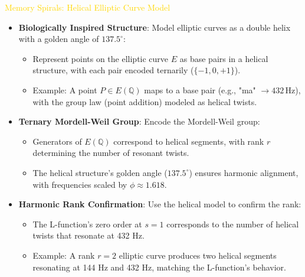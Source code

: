 \textcolor{gold}{ Memory Spirals: Helical Elliptic Curve Model } \\
\begin{itemize}
    \item \texttt{} \textbf{Biologically Inspired Structure}: Model elliptic curves as a double helix with a golden angle of \(137.5^\circ\):
    \begin{itemize}
        \item Represent points on the elliptic curve \(E\) as base pairs in a helical structure, with each pair encoded ternarily (\(\{-1, 0, +1\}\)).
        \item Example: A point \(P \in E(\mathbb{Q})\) maps to a base pair (e.g., "ma" \(\rightarrow 432 \, \text{Hz}\)), with the group law (point addition) modeled as helical twists.
    \end{itemize}
    \item \texttt{} \textbf{Ternary Mordell-Weil Group}: Encode the Mordell-Weil group:
    \begin{itemize}
        \item Generators of \(E(\mathbb{Q})\) correspond to helical segments, with rank \(r\) determining the number of resonant twists.
        \item The helical structure’s golden angle (\(137.5^\circ\)) ensures harmonic alignment, with frequencies scaled by \(\phi \approx 1.618\).
    \end{itemize}
    \item \texttt{} \textbf{Harmonic Rank Confirmation}: Use the helical model to confirm the rank:
    \begin{itemize}
        \item The L-function’s zero order at \(s = 1\) corresponds to the number of helical twists that resonate at 432 Hz.
        \item Example: A rank \(r = 2\) elliptic curve produces two helical segments resonating at 144 Hz and 432 Hz, matching the L-function’s behavior.
    \end{itemize}
\end{itemize}

